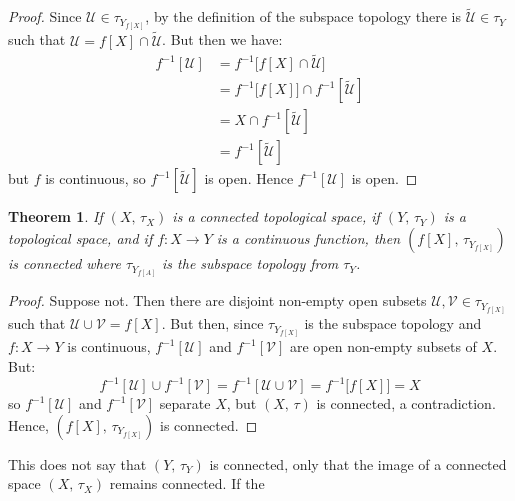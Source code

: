 \documentclass{article}
\theoremstyle{plain}
\newtheorem{theorem}{Theorem}[section]
\theoremstyle{normal}
\begin{document}
        \begin{proof}
            Since $\mathcal{U}\in\tau_{Y_{f[X]}}$, by the definition of the
            subspace topology there is $\tilde{\mathcal{U}}\in\tau_{Y}$ such
            that $\mathcal{U}=f[X]\cap\tilde{\mathcal{U}}$. But then we have:
            \begin{align}
                f^{-1}[\mathcal{U}]
                &=f^{-1}\big[f[X]\cap\tilde{\mathcal{U}}\big]\\
                &=f^{-1}\big[f[X]\big]\cap{f}^{-1}[\tilde{\mathcal{U}}]\\
                &=X\cap{f}^{-1}[\tilde{\mathcal{U}}]\\
                &=f^{-1}[\tilde{\mathcal{U}}]
            \end{align}
            but $f$ is continuous, so $f^{-1}[\tilde{\mathcal{U}}]$ is open.
            Hence $f^{-1}[\mathcal{U}]$ is open.
        \end{proof}
        \begin{theorem}
            If $(X,\,\tau_{X})$ is a connected topological space, if
            $(Y,\,\tau_{Y})$ is a topological space, and if $f:X\rightarrow{Y}$
            is a continuous function, then $(f[X],\,\tau_{Y_{f[X]}})$ is
            connected where $\tau_{Y_{f[A]}}$ is the subspace topology from
            $\tau_{Y}$.
        \end{theorem}
        \begin{proof}
            Suppose not. Then there are disjoint non-empty open subsets
            $\mathcal{U},\mathcal{V}\in\tau_{Y_{f[X]}}$ such that
            $\mathcal{U}\cup\mathcal{V}=f[X]$. But then, since $\tau_{Y_{f[X]}}$
            is the subspace topology and $f:X\rightarrow{Y}$ is continuous,
            $f^{-1}[\mathcal{U}]$ and $f^{-1}[\mathcal{V}]$ are open non-empty
            subsets of $X$. But:
            \begin{equation}
                f^{-1}[\mathcal{U}]\cup{f}^{-1}[\mathcal{V}]
                =f^{-1}[\mathcal{U}\cup\mathcal{V}]
                =f^{-1}\big[f[X]\big]
                =X
            \end{equation}
            so $f^{-1}[\mathcal{U}]$ and $f^{-1}[\mathcal{V}]$ separate $X$,
            but $(X,\,\tau)$ is connected, a contradiction. Hence,
            $(f[X],\,\tau_{Y_{f[X]}})$ is connected.
        \end{proof}
        This does not say that $(Y,\,\tau_{Y})$ is connected, only that the
        image of a connected space $(X,\,\tau_{X})$ remains connected. If the
\end{document}
